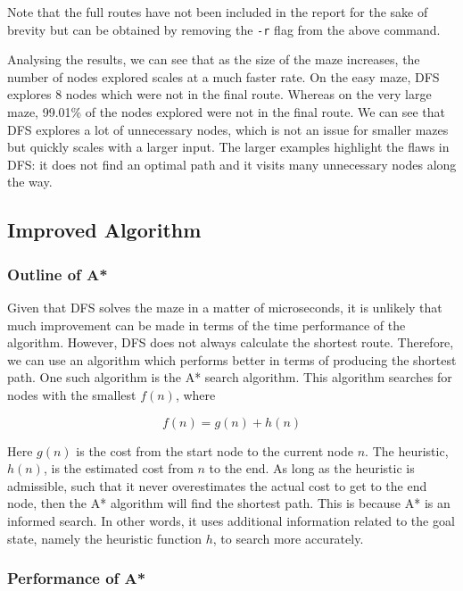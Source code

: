 \documentclass[11pt]{article}
\newcommand{\ssl}[1]{\texttt{#1}}
\begin{document}
Note that the full routes have not been included in the report for the
sake of brevity but can be obtained by removing the \ssl{-r} flag from the
above command.

Analysing the results, we can see that as the size of the maze
increases, the number of nodes explored scales at a much faster rate. On
the easy maze, DFS explores 8 nodes which were not in the final route.
Whereas on the very large maze, 99.01\% of the nodes explored were not
in the final route. We can see that DFS explores a lot of unnecessary
nodes, which is not an issue for smaller mazes but quickly scales with a
larger input. The larger examples highlight the flaws in DFS: it does
not find an optimal path and it visits many unnecessary nodes along the
way.

\subsection{Improved Algorithm}\label{improved-algorithm}

\subsubsection{Outline of A*}\label{outline-of-a}

Given that DFS solves the maze in a matter of microseconds, it is
unlikely that much improvement can be made in terms of the time
performance of the algorithm. However, DFS does not always calculate the
shortest route. Therefore, we can use an algorithm which performs better
in terms of producing the shortest path. One such algorithm is the A*
search algorithm. This algorithm searches for nodes with the smallest
$f(n)$, where

\[
f(n)=g(n)+h(n)
\]

Here $g(n)$ is the cost from the start node to the current node $n$.
The heuristic, $h(n)$, is the estimated cost from $n$ to the end. As
long as the heuristic is admissible, such that it never overestimates
the actual cost to get to the end node, then the A* algorithm will find
the shortest path. This is because A* is an informed search. In other words,
it uses additional information related to the goal state, namely the
heuristic function $h$, to search more accurately.


\subsubsection{Performance of A*}\label{performance-of-a}
\end{document}
